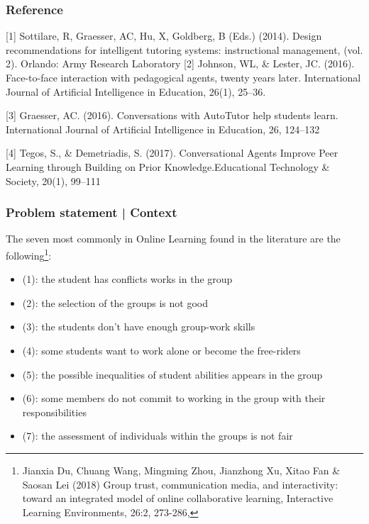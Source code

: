 \documentclass{beamer}
\begin{document}
\begin{frame}
\frametitle{Reference}
\begin{thebibliography}{01}
{\scriptsize 	{}	[1] Sottilare, R, Graesser, AC, Hu, X, Goldberg, B (Eds.) (2014). Design recommendations
for intelligent tutoring systems: instructional management, (vol. 2). Orlando:
Army Research Laboratory
 [2] 	Johnson, WL, \& Lester, JC. (2016). Face-to-face interaction with pedagogical
agents, twenty years later. International Journal of Artificial Intelligence in
Education, 26(1), 25–36.
		
 [3]	Graesser, AC. (2016). Conversations with AutoTutor help students learn.
International Journal of Artificial Intelligence in Education, 26, 124–132	

  [4] Tegos,  S.,  \&  Demetriadis,  S.  (2017). Conversational  Agents  Improve Peer  Learning  through  Building  on Prior  Knowledge.Educational Technology \& Society, 20(1), 99–111}
\end{thebibliography}
\end{frame}
\begin{frame}
\frametitle{Problem statement | Context}
The seven most commonly in Online Learning found in the literature are the following\footnote{{\tiny Jianxia Du, Chuang Wang, Mingming Zhou, Jianzhong Xu, Xitao Fan \& Saosan Lei (2018) Group trust, communication media, and interactivity: toward an integrated model of online collaborative learning, Interactive Learning Environments, 26:2, 273-286,}
}:
{\footnotesize \begin{itemize}
	\item (1): the student has conflicts works in the group
	\item (2): the selection of the groups is not good
	\item (3): the students don't have enough group-work skills
	\item (4):  some students want to work alone or become the free-riders
	\item (5):  the possible inequalities of student abilities appears in the group
	\item (6):  some members do not commit to working in the group with their responsibilities
	\item (7): the assessment of individuals within the groups is not fair
\end{itemize}}


\end{frame}
\end{document}
